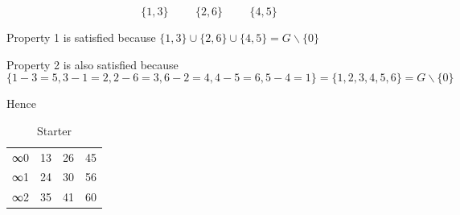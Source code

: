\documentclass[
  11pt,
  a4paper]{book}
\begin{document}
\[\{1,3\} \hspace{1cm} \{2,6\} \hspace{1cm} \{4,5\}\]

Property 1 is satisfied because
\(\{1,3\} \cup \{2,6\} \cup \{4,5\} = G \backslash \{0\}\)

Property 2 is also satisfied because
\[\{1 - 3 = 5, 3 - 1 = 2, 2 - 6 = 3, 6 - 2 = 4, 4 - 5 = 6, 5 - 4 = 1\} = \{1, 2, 3, 4, 5, 6\} = G\backslash \{0\}\]

Hence

\begin{longtable}[]{@{}llll@{}}
\caption{\label{tab:starter-demo} Starter}\tabularnewline
\toprule
\endhead
\begin{minipage}[t]{0.06\columnwidth}\raggedright
∞0\strut
\end{minipage} & \begin{minipage}[t]{0.06\columnwidth}\raggedright
13\strut
\end{minipage} & \begin{minipage}[t]{0.06\columnwidth}\raggedright
26\strut
\end{minipage} & \begin{minipage}[t]{0.06\columnwidth}\raggedright
45\strut
\end{minipage}\tabularnewline
\begin{minipage}[t]{0.06\columnwidth}\raggedright
∞1\strut
\end{minipage} & \begin{minipage}[t]{0.06\columnwidth}\raggedright
24\strut
\end{minipage} & \begin{minipage}[t]{0.06\columnwidth}\raggedright
30\strut
\end{minipage} & \begin{minipage}[t]{0.06\columnwidth}\raggedright
56\strut
\end{minipage}\tabularnewline
\begin{minipage}[t]{0.06\columnwidth}\raggedright
∞2\strut
\end{minipage} & \begin{minipage}[t]{0.06\columnwidth}\raggedright
35\strut
\end{minipage} & \begin{minipage}[t]{0.06\columnwidth}\raggedright
41\strut
\end{minipage} & \begin{minipage}[t]{0.06\columnwidth}\raggedright
60\strut
\end{minipage}\tabularnewline

\end{longtable}
\end{document}
